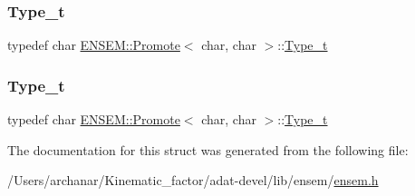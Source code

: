 \subsubsection{\texorpdfstring{Type\_t}{Type\_t}\hspace{0.1cm}{\footnotesize\ttfamily [2/3]}}
{\footnotesize\ttfamily typedef char \mbox{\hyperlink{structENSEM_1_1Promote}{E\+N\+S\+E\+M\+::\+Promote}}$<$ char, char $>$\+::\mbox{\hyperlink{structENSEM_1_1Promote_3_01char_00_01char_01_4_a3353ceefb3e26f60983a352e42d691ed}{Type\+\_\+t}}}

\mbox{\label{structENSEM_1_1Promote_3_01char_00_01char_01_4_a3353ceefb3e26f60983a352e42d691ed}} 
\subsubsection{\texorpdfstring{Type\_t}{Type\_t}\hspace{0.1cm}{\footnotesize\ttfamily [3/3]}}
{\footnotesize\ttfamily typedef char \mbox{\hyperlink{structENSEM_1_1Promote}{E\+N\+S\+E\+M\+::\+Promote}}$<$ char, char $>$\+::\mbox{\hyperlink{structENSEM_1_1Promote_3_01char_00_01char_01_4_a3353ceefb3e26f60983a352e42d691ed}{Type\+\_\+t}}}



The documentation for this struct was generated from the following file\+:\begin{DoxyCompactItemize}
\item 
/\+Users/archanar/\+Kinematic\+\_\+factor/adat-\/devel/lib/ensem/\mbox{\hyperlink{adat-devel_2lib_2ensem_2ensem_8h}{ensem.\+h}}\end{DoxyCompactItemize}
